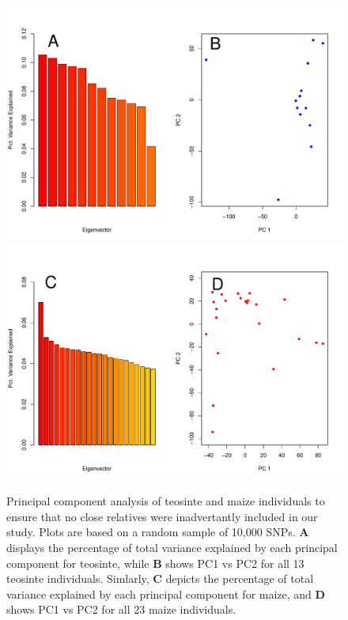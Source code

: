 \begin{figure}
  \begin{center}
  \includegraphics[width=.75\textwidth]{FigsAndFiles/tilPCA_aug.pdf}\\
  \includegraphics[width=.75\textwidth]{FigsAndFiles/bknPCA_aug.pdf}\\
  \end{center}
  \caption{Principal component analysis of teosinte and maize individuals to ensure that no close relatives were inadvertantly included in our study. Plots are based on a random sample of 10,000 SNPs. {\bf A} displays the percentage of total variance explained by each principal component for teosinte, while {\bf B} shows PC1 vs PC2 for all 13 teosinte individuals. Simlarly, {\bf C} depicts the percentage of total variance explained by each principal component for maize, and {\bf D} shows PC1 vs PC2 for all 23 maize individuals. \label{sFig:PCA}}
\end{figure}
\clearpage

